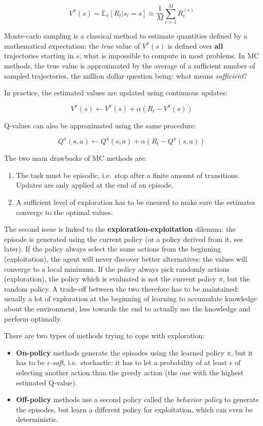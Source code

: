\documentclass[
  letterpaper,
  DIV=11,
  numbers=noendperiod]{scrreprt}
\providecommand{\tightlist}{%
  \setlength{\itemsep}{0pt}\setlength{\parskip}{0pt}}\usepackage{longtable,booktabs,array}
\begin{document}
\[V^\pi(s) = \mathbb{E}_\pi[R_t | s_t = s] \approx \frac{1}{M} \sum_{e=1}^M R_t^{(e)}\]

Monte-carlo sampling is a classical method to estimate quantities
defined by a mathematical expectation: the \emph{true} value of
\(V^\pi(s)\) is defined over \textbf{all} trajectories starting in
\(s\), what is impossible to compute in most problems. In MC methods,
the true value is approximated by the average of a sufficient number of
sampled trajectories, the million dollar question being: what means
\emph{sufficient}?

In practice, the estimated values are updated using continuous updates:

\[
    V^\pi(s) \leftarrow V^\pi(s) + \alpha (R_t - V^\pi(s))
\]

Q-values can also be approximated using the same procedure:

\[
    Q^\pi(s, a) \leftarrow Q^\pi(s, a) + \alpha (R_t - Q^\pi(s, a))
\]

The two main drawbacks of MC methods are:

\begin{enumerate}
\def\labelenumi{\arabic{enumi}.}
\tightlist
\item
  The task must be episodic, i.e.~stop after a finite amount of
  transitions. Updates are only applied at the end of an episode.
\item
  A sufficient level of exploration has to be ensured to make sure the
  estimates converge to the optimal values.
\end{enumerate}

The second issue is linked to the \textbf{exploration-exploitation}
dilemma: the episode is generated using the current policy (or a policy
derived from it, see later). If the policy always select the same
actions from the beginning (exploitation), the agent will never discover
better alternatives: the values will converge to a local minimum. If the
policy always pick randomly actions (exploration), the policy which is
evaluated is not the current policy \(\pi\), but the random policy. A
trade-off between the two therefore has to be maintained: usually a lot
of exploration at the beginning of learning to accumulate knowledge
about the environment, less towards the end to actually use the
knowledge and perform optimally.

There are two types of methods trying to cope with exploration:

\begin{itemize}
\tightlist
\item
  \textbf{On-policy} methods generate the episodes using the learned
  policy \(\pi\), but it has to be \emph{\(\epsilon\)-soft},
  i.e.~stochastic: it has to let a probability of at least \(\epsilon\)
  of selecting another action than the greedy action (the one with the
  highest estimated Q-value).
\item
  \textbf{Off-policy} methods use a second policy called the
  \emph{behavior policy} to generate the episodes, but learn a different
  policy for exploitation, which can even be deterministic.
\end{itemize}
\end{document}
